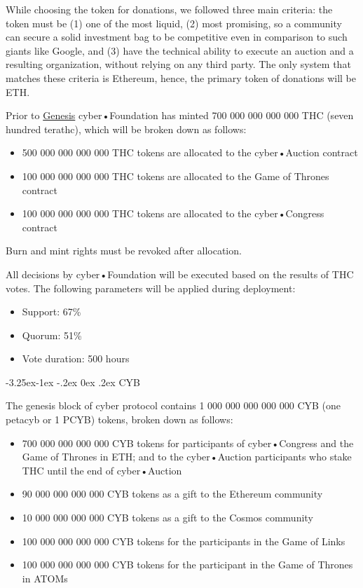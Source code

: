 \documentclass[8pt,oneside]{amsart}
\makeatletter
\renewcommand\subsection{\@startsection{subsection}{2}{\z@}%
                                     {-3.25ex\@plus -1ex \@minus -.2ex}%
                                     {0ex \@plus .2ex}%
                                     {\play\Large}}%
\newcommand{\titleSection}[1]{\subsection{#1}}
\newcommand{\code}[1]{{\PlayBold #1}}
\newenvironment{Figure}
  {\par\medskip\noindent\minipage{\linewidth}}
  {\endminipage\par\medskip}
\makeatother
\begin{document}
\begin{Abstract}
While choosing the token for donations, we followed three main criteria: the token must be (1) one of the most liquid, (2) most promising, so a community can secure a solid investment bag to be competitive even in comparison to such giants like Google, and (3) have the technical ability to execute an auction and a resulting organization, without relying on any third party. The only system that matches these criteria is Ethereum, hence, the primary token of donations will be ETH.

Prior to \hyperlink{genesis}{Genesis} cyber•Foundation has minted 700 000 000 000 000 THC (seven hundred terathc), which will be broken down as follows:

\begin{itemize}
\item 500 000 000 000 000 THC tokens are allocated to the cyber•Auction contract
\item 100 000 000 000 000 THC tokens are allocated to the Game of Thrones contract
\item 100 000 000 000 000 THC tokens are allocated to the cyber•Congress contract
\end{itemize}

\begin{Figure}
 \centering
 
\end{Figure}

Burn and mint rights must be revoked after allocation.

All decisions by cyber•Foundation will be executed based on the results of THC votes. The following parameters will be applied during deployment:

\begin{itemize}
\item Support: 67\%
\item Quorum: 51\%
\item Vote duration: 500 hours
\end{itemize}

\titleSection{CYB}\label{CYB}

The genesis block of \code{cyber} protocol contains 1 000 000 000 000 000 CYB (one petacyb or 1 PCYB) tokens, broken down as follows:

\begin{itemize}
\item 700 000 000 000 000 CYB tokens for participants of cyber•Congress and the Game of Thrones in ETH; and to the cyber•Auction participants who stake THC until the end of cyber•Auction
\item 90 000 000 000 000 CYB tokens as a gift to the Ethereum community
\item 10 000 000 000 000 CYB tokens as a gift to the Cosmos community
\item 100 000 000 000 000 CYB tokens for the participants in the Game of Links
\item 100 000 000 000 000 CYB tokens for the participant in the Game of Thrones in ATOMs


\end{itemize}
\end{Abstract}
\end{document}
